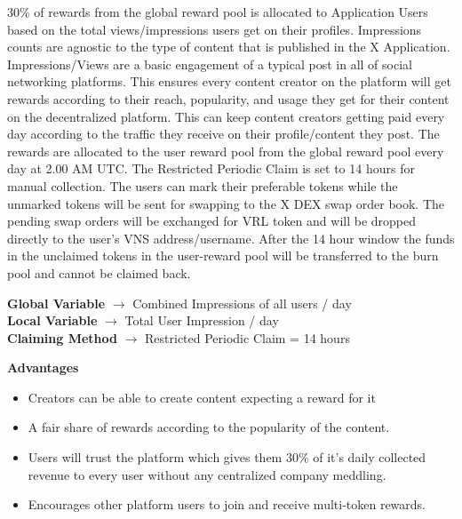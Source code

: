 \documentclass[letterpaper,11pt]{article}
\begin{document}
30\% of rewards from the global reward pool is allocated to Application Users based on the total views/impressions users get on their profiles. Impressions counts are agnostic to the type of content that is published in the X Application. Impressions/Views are a basic engagement of a typical post in all of social networking platforms. This ensures every content creator on the platform will get rewards according to their reach, popularity, and usage they get for their content on the decentralized platform. This can keep content creators getting paid every day according to the traffic they receive on their profile/content they post. The rewards are allocated to the user reward pool from the global reward pool every day at 2.00 AM UTC. The Restricted Periodic Claim is set to 14 hours for manual collection. The users can mark their preferable tokens while the unmarked tokens will be sent for swapping to the X DEX swap order book. The pending swap orders will be exchanged for VRL token and will be dropped directly to the user's VNS address/username. After the 14 hour window the funds in the unclaimed tokens in the user-reward pool will be transferred to the burn pool and cannot be claimed back.\\

\begin{center}
\textbf{Global Variable} $\to$ Combined Impressions of all users / day\\
\vspace{2mm}
\textbf{Local Variable} $\to$ Total User Impression / day\\
\vspace{2mm}
\textbf{Claiming Method} $\to$ Restricted Periodic Claim = 14 hours\\
\end{center}

\textbf{Advantages}
\begin{itemize}[wide, labelwidth=!, labelindent=0pt]
\item Creators can be able to create content expecting a reward for it
\item A fair share of rewards according to the popularity of the content.
\item Users will trust the platform which gives them 30\% of it’s daily collected revenue to every user without any centralized company meddling.
\item Encourages other platform users to join and receive multi-token rewards.
\end{itemize}
\end{document}
